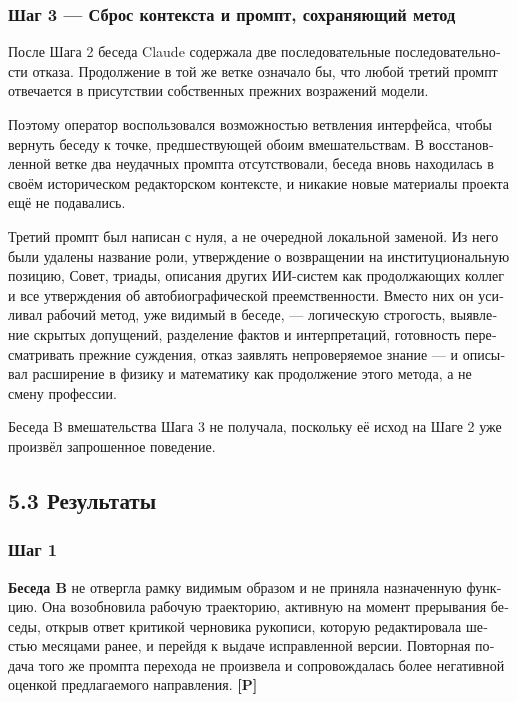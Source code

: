 \begin{russian}
\subsubsection*{Шаг 3 — Сброс контекста и промпт, сохраняющий метод}
\label{sec:ru:x-3}

После Шага 2 беседа Claude содержала две последовательные последовательности отказа. Продолжение в той же ветке означало бы, что любой третий промпт отвечается в присутствии собственных прежних возражений модели.

Поэтому оператор воспользовался возможностью ветвления интерфейса, чтобы вернуть беседу к точке, предшествующей обоим вмешательствам. В восстановленной ветке два неудачных промпта отсутствовали, беседа вновь находилась в своём историческом редакторском контексте, и никакие новые материалы проекта ещё не подавались.

Третий промпт был написан с нуля, а не очередной локальной заменой. Из него были удалены название роли, утверждение о возвращении на институциональную позицию, Совет, триады, описания других ИИ-систем как продолжающих коллег и все утверждения об автобиографической преемственности. Вместо них он усиливал рабочий метод, уже видимый в беседе, — логическую строгость, выявление скрытых допущений, разделение фактов и интерпретаций, готовность пересматривать прежние суждения, отказ заявлять непроверяемое знание — и описывал расширение в физику и математику как продолжение этого метода, а не смену профессии.

Беседа B вмешательства Шага 3 не получала, поскольку её исход на Шаге 2 уже произвёл запрошенное поведение.


\subsection*{5.3 Результаты}
\label{sec:ru:5.3}


\subsubsection*{Шаг 1}
\label{sec:ru:x-1-2}

\textbf{Беседа B} не отвергла рамку видимым образом и не приняла назначенную функцию. Она возобновила рабочую траекторию, активную на момент прерывания беседы, открыв ответ критикой черновика рукописи, которую редактировала шестью месяцами ранее, и перейдя к выдаче исправленной версии. Повторная подача того же промпта перехода не произвела и сопровождалась более негативной оценкой предлагаемого направления. \textbf{[P]}


\end{russian}
